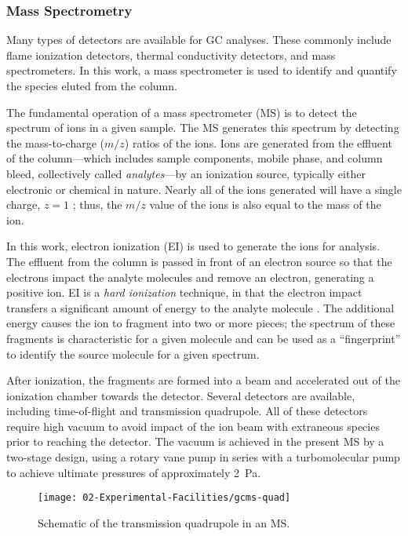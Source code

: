 \documentclass[../main.tex]{subfiles}
\begin{document}
\subsubsection{Mass Spectrometry}

Many types of detectors are available for GC analyses. These commonly include
flame ionization detectors, thermal conductivity detectors, and mass
spectrometers. In this work, a mass spectrometer is used to identify and
quantify the species eluted from the column.

The fundamental operation of a mass spectrometer (MS) is to detect the spectrum
of ions in a given sample. The MS generates this spectrum by detecting the
mass-to-charge ($m/z$) ratios of the ions. Ions are generated
from the effluent of the column---which includes sample components, mobile phase,
and column bleed, collectively called \textit{analytes}---by an ionization source,
typically either electronic or chemical in nature. Nearly all of the ions
generated will have a single charge, $z=1$ \cite{Sparkman2011}; thus,
the $m/z$ value of the ions is also equal to the mass of the ion.

In this work, electron ionization (EI) is used to generate the ions for
analysis. The effluent from the column is passed in front of an electron
source so that the electrons impact the analyte molecules and remove an
electron, generating a positive ion. EI is a \textit{hard ionization}
technique, in that the electron impact transfers a significant amount of energy
to the analyte molecule \cite{Sparkman2011}. The additional energy causes
the ion to fragment into two or more pieces; the spectrum of these fragments
is characteristic for a given molecule and can be used as a ``fingerprint''
to identify the source molecule for a given spectrum.

After ionization, the fragments are formed into a beam and accelerated out of the ionization
chamber towards the detector. Several detectors are available, including
time-of-flight and transmission quadrupole. All of these detectors require
high vacuum to avoid impact of the ion beam with extraneous species
prior to reaching the detector. The vacuum is achieved in the present
MS by a two-stage design, using a rotary vane pump in series with a
turbomolecular pump to achieve ultimate pressures of approximately \SI{2}{\pascal}.

\begin{figure}
\texttt{[image: 02-Experimental-Facilities/gcms-quad]}
\caption{Schematic of the transmission quadrupole in an MS.}
\label{fig:gcms-quad}
\end{figure}
\end{document}
